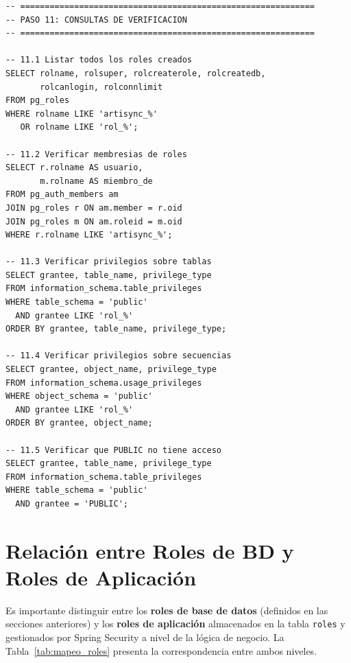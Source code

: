 \documentclass[conference, onecolumn]{IEEEtran}
\begin{document}
\begin{lstlisting}[caption={Consultas de verificación de privilegios}, label={lst:verificacion}]
-- ============================================================
-- PASO 11: CONSULTAS DE VERIFICACION
-- ============================================================

-- 11.1 Listar todos los roles creados
SELECT rolname, rolsuper, rolcreaterole, rolcreatedb,
       rolcanlogin, rolconnlimit
FROM pg_roles
WHERE rolname LIKE 'artisync_%'
   OR rolname LIKE 'rol_%';

-- 11.2 Verificar membresias de roles
SELECT r.rolname AS usuario,
       m.rolname AS miembro_de
FROM pg_auth_members am
JOIN pg_roles r ON am.member = r.oid
JOIN pg_roles m ON am.roleid = m.oid
WHERE r.rolname LIKE 'artisync_%';

-- 11.3 Verificar privilegios sobre tablas
SELECT grantee, table_name, privilege_type
FROM information_schema.table_privileges
WHERE table_schema = 'public'
  AND grantee LIKE 'rol_%'
ORDER BY grantee, table_name, privilege_type;

-- 11.4 Verificar privilegios sobre secuencias
SELECT grantee, object_name, privilege_type
FROM information_schema.usage_privileges
WHERE object_schema = 'public'
  AND grantee LIKE 'rol_%'
ORDER BY grantee, object_name;

-- 11.5 Verificar que PUBLIC no tiene acceso
SELECT grantee, table_name, privilege_type
FROM information_schema.table_privileges
WHERE table_schema = 'public'
  AND grantee = 'PUBLIC';
\end{lstlisting}

\section{Relación entre Roles de BD y Roles de Aplicación}

Es importante distinguir entre los \textbf{roles de base de datos} (definidos en las secciones anteriores) y los \textbf{roles de aplicación} almacenados en la tabla \texttt{roles} y gestionados por Spring Security a nivel de la lógica de negocio. La Tabla~\ref{tab:mapeo_roles} presenta la correspondencia entre ambos niveles.
\end{document}
